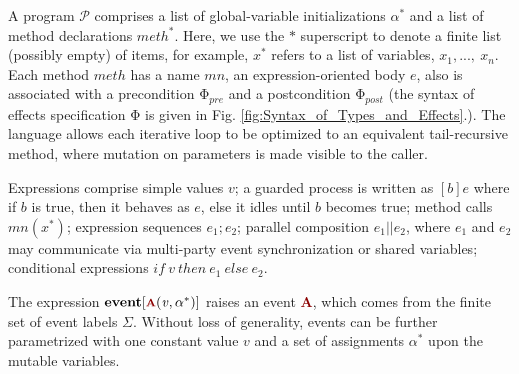 \documentclass[acmsmall,10pt,review]{acmart}
\newcommand{\effect}{{\ensuremath{\mathrm{\Phi}}}}
\newcommand{\anyevent}[1]{{\textcolor{darkred}
{{\textbf{\footnotesize #1}}}}}
\newcommand{\code}[1]{{\tt{\ensuremath{\m{#1}}}}}
\newcommand{\m}{\mathit}
\newcommand\figref[1]{Fig. \textcolor{black}{\ref{#1}}.}
\begin{document}
{A program \code{\mathcal{P}} comprises a list of 
global-variable initializations \code{\alpha^*} and 
a list of 
method declarations \code{{meth^*}}. 
Here, we use the \code{*} superscript to denote a finite list (possibly empty) of items, for example, \code{{x^*}} refers to a list of variables, \code{x_1, ...,\ x_n}. 
Each method \code{meth} has a name \code{mn}, an expression-oriented body \code{e}, also is associated with a precondition  \code{\effect_{pre}} and a postcondition \code{\effect_{post}} (the syntax of effects specification \code{\effect} is given in \figref{fig:Syntax_of_Types_and_Effects}).
The language allows each iterative loop to be optimized to an equivalent 
tail-recursive method, where mutation on parameters is made visible 
to the caller. 

Expressions comprise simple values \code{v};
a guarded process is written as \code{[b]e} where if \code{b} is true, 
then it behaves as \code{e}, else it idles until \code{b} becomes true; 
method calls \code{mn({x^*})}; 
expression sequences \code{e_1;e_2};
parallel composition \code{e_1 || e_2}, where \code{e_1} and \code{e_2} 
may communicate via multi-party event synchronization or shared variables; 
conditional expressions \code{{if}\ v\ {then}\ e_1\ {else}\ e_2}. 

The expression \code{ \textbf{event} [\anyevent{A}(v,  \alpha^*)] } 
raises an event \anyevent{A}, which comes from the finite 
set of event labels \code{\Sigma}. %
Without loss of generality, events can be further parametrized with 
one constant value \code{v} and a set of assignments \code{\alpha^*} upon 
the mutable variables. %



}
\end{document}
